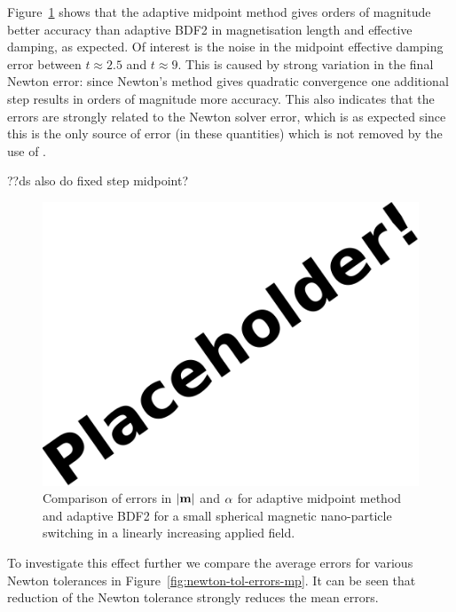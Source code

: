 Figure~\ref{fig:linear-field-switch-errors-mp} shows that the adaptive midpoint method gives orders of magnitude better accuracy than adaptive BDF2 in magnetisation length and effective damping, as expected.
Of interest is the noise in the midpoint effective damping error between $t \approx 2.5$ and $t \approx 9$.
This is caused by strong variation in the final Newton error: since Newton's method gives quadratic convergence one additional step results in orders of magnitude more accuracy.
This also indicates that the errors are strongly related to the Newton solver error, which is as expected since this is the only source of error (in these quantities) which is not removed by the use of \imr.

??ds also do fixed step midpoint?

\begin{figure}[ht!]
  \centering
  \includegraphics{images/placeholder}
  \caption{Comparison of errors in $\lvert \mathbf{m} \rvert$ and $\alpha$ for adaptive midpoint method and adaptive BDF2 for a small spherical magnetic nano-particle switching in a linearly increasing applied field.}
  \label{fig:linear-field-switch-errors-mp}
\end{figure}


To investigate this effect further we compare the average errors for various Newton tolerances in Figure~\ref{fig:newton-tol-errors-mp}.
It can be seen that reduction of the Newton tolerance strongly reduces the mean errors.

